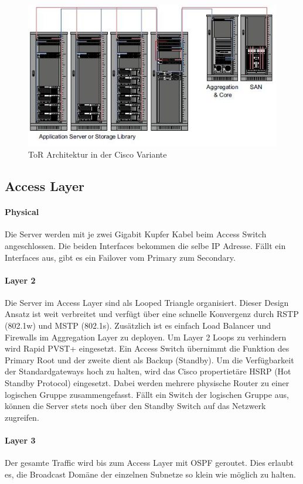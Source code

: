 \begin{figure}[h]
\centering
\includegraphics[width=0.5\linewidth]{images/tor_architecture}
\caption{ToR Architektur in der Cisco Variante}
\label{fig:torarchitecture}
\end{figure}



\subsection{Access Layer}
\paragraph{Physical}
Die Server werden mit je zwei Gigabit Kupfer Kabel beim Access Switch angeschlossen. Die beiden Interfaces bekommen die selbe IP Adresse. Fällt ein Interfaces aus, gibt es ein Failover vom Primary zum Secondary.

\paragraph{Layer 2}
Die Server im Access Layer sind als Looped Triangle organisiert. Dieser Design Ansatz ist weit verbreitet und verfügt über eine schnelle Konvergenz durch RSTP (802.1w) und MSTP (802.1s). Zusätzlich ist es einfach Load Balancer und Firewalls im Aggregation Layer zu deployen. Um Layer 2 Loops zu verhindern wird Rapid PVST+ eingesetzt. Ein Access Switch übernimmt die Funktion des Primary Root und der zweite dient als Backup (Standby). Um die Verfügbarkeit der Standardgateways hoch zu halten, wird das Cisco propertietäre HSRP (Hot Standby Protocol) eingesetzt.  Dabei werden mehrere physische Router zu einer logischen Gruppe zusammengefasst. Fällt ein Switch der logischen Gruppe aus, können die Server stets noch über den Standby Switch auf das Netzwerk zugreifen. 

\paragraph{Layer 3}
Der gesamte Traffic wird bis zum Access Layer mit OSPF geroutet. Dies erlaubt es, die Broadcast Domäne der einzelnen Subnetze so klein wie möglich zu halten.

